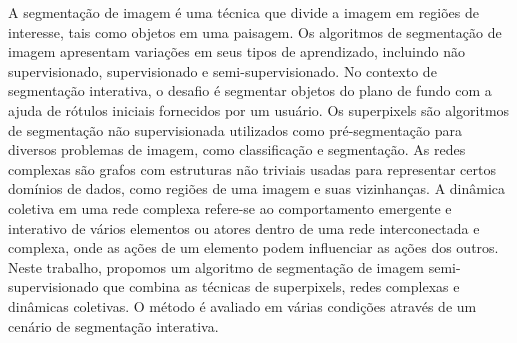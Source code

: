 A segmentação de imagem é uma técnica que divide a imagem em regiões
de interesse, tais como objetos em uma paisagem. Os algoritmos de
segmentação de imagem apresentam variações em seus tipos de
aprendizado, incluindo não supervisionado, supervisionado e
semi-supervisionado. No contexto de segmentação interativa, o desafio
é segmentar objetos do plano de fundo com a ajuda de rótulos iniciais
fornecidos por um usuário. Os superpixels são algoritmos de
segmentação não supervisionada utilizados como pré-segmentação para
diversos problemas de imagem, como classificação e segmentação. As
redes complexas são grafos com estruturas não triviais usadas para
representar certos domínios de dados, como regiões de uma imagem e
suas vizinhanças. A dinâmica coletiva em uma rede complexa refere-se
ao comportamento emergente e interativo de vários elementos ou atores
dentro de uma rede interconectada e complexa, onde as ações de um
elemento podem influenciar as ações dos outros. Neste trabalho,
propomos um algoritmo de segmentação de imagem semi-supervisionado que
combina as técnicas de superpixels, redes complexas e dinâmicas
coletivas. O método é avaliado em várias condições através de um
cenário de segmentação interativa.

